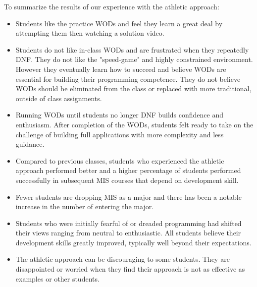 To summarize the results of our experience with the athletic approach:
\begin{itemize} 
\item Students like the practice WODs and feel they learn a great deal by attempting them then watching a solution video.
\item Students do not like in-class WODs and are frustrated when they repeatedly DNF. They do not like the "speed-game" and highly constrained environment. However they eventually learn how to succeed and believe WODs are essential for building their programming competence. They do not believe WODs should be eliminated from the class or replaced with more traditional, outside of class assignments.
\item Running WODs until students no longer DNF builds confidence and enthusiasm. After completion of the WODs, students felt ready to take on the challenge of building full applications with more complexity and less guidance. 
\item Compared to previous classes, students who experienced the athletic approach performed better and a higher percentage of students performed successfully in subsequent MIS courses that depend on development skill.  
\item Fewer students are dropping MIS as a major and there has been a notable increase in the number of entering the major. 
\item Students who were initially fearful of or dreaded programming had shifted their views ranging from neutral to enthusiastic. All students believe their development skills greatly improved, typically well beyond their expectations.
\item The athletic approach can be discouraging to some students. They are disappointed or worried when they find their approach is not as effective as examples or other students.    
\end{itemize} 